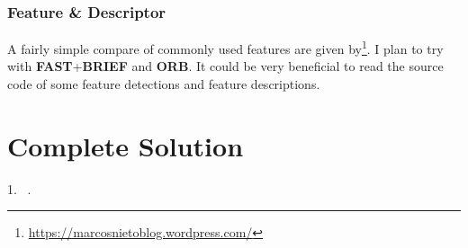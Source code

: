 \documentclass[a4paper]{report}
\begin{document}
\subsection{Feature \& Descriptor}
A fairly simple compare of commonly used features are given by\footnote{\url{https://marcosnietoblog.wordpress.com/}}.
I plan to try with \textbf{FAST}+\textbf{BRIEF} and \textbf{ORB}.
It could be very beneficial to read the source code of some feature detections and feature descriptions.

\chapter{Complete Solution}
1. ~\cite{schmidt2005calibration}.

 

\end{document}
